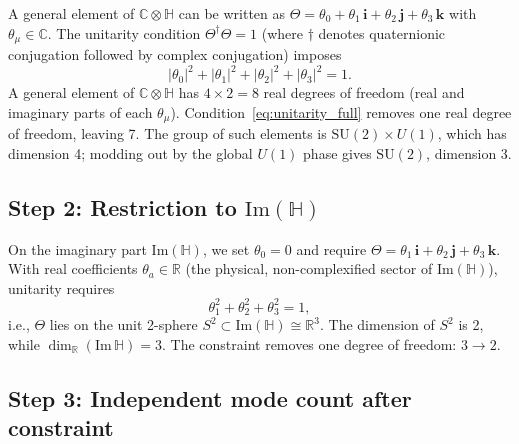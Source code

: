 \documentclass[11pt,a4paper]{article}
\theoremstyle{definition}
\theoremstyle{remark}
\begin{document}
A general element of $\mathbb{C}\otimes\mathbb{H}$ can be written as
$\Theta = \theta_0 + \theta_1\,\mathbf{i} + \theta_2\,\mathbf{j} + \theta_3\,\mathbf{k}$
with $\theta_\mu \in \mathbb{C}$.
The unitarity condition $\Theta^\dagger\Theta = 1$ (where $\dagger$ denotes
quaternionic conjugation followed by complex conjugation) imposes
\begin{equation}
  |\theta_0|^2 + |\theta_1|^2 + |\theta_2|^2 + |\theta_3|^2 = 1.
  \label{eq:unitarity_full}
\end{equation}
A general element of $\mathbb{C}\otimes\mathbb{H}$ has $4 \times 2 = 8$ real degrees
of freedom (real and imaginary parts of each $\theta_\mu$).
Condition~\eqref{eq:unitarity_full} removes one real degree of freedom, leaving 7.
The group of such elements is $\mathrm{SU}(2) \times U(1)$, which has dimension 4;
modding out by the global $U(1)$ phase gives $\mathrm{SU}(2)$, dimension 3.

\subsection{Step 2: Restriction to $\mathrm{Im}(\mathbb{H})$}

On the imaginary part $\mathrm{Im}(\mathbb{H})$, we set $\theta_0 = 0$ and require
$\Theta = \theta_1\,\mathbf{i} + \theta_2\,\mathbf{j} + \theta_3\,\mathbf{k}$.
With real coefficients $\theta_a \in \mathbb{R}$ (the physical, non-complexified
sector of $\mathrm{Im}(\mathbb{H})$), unitarity requires
\begin{equation}
  \theta_1^2 + \theta_2^2 + \theta_3^2 = 1,
  \label{eq:unitarity_Im}
\end{equation}
i.e., $\Theta$ lies on the unit 2-sphere $S^2 \subset \mathrm{Im}(\mathbb{H}) \cong \mathbb{R}^3$.
The dimension of $S^2$ is 2, while $\dim_\mathbb{R}(\mathrm{Im}\,\mathbb{H}) = 3$.
The constraint removes one degree of freedom: $3 \to 2$.

\subsection{Step 3: Independent mode count after constraint}
\end{document}
